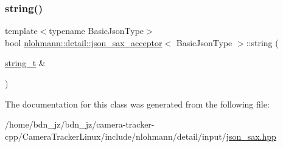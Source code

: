 \subsubsection{\texorpdfstring{string()}{string()}}
{\footnotesize\ttfamily template$<$typename Basic\+Json\+Type$>$ \\
bool \hyperlink{classnlohmann_1_1detail_1_1json__sax__acceptor}{nlohmann\+::detail\+::json\+\_\+sax\+\_\+acceptor}$<$ Basic\+Json\+Type $>$\+::string (\begin{DoxyParamCaption}\item[{\hyperlink{classnlohmann_1_1detail_1_1json__sax__acceptor_a3a8078bbf865ec355106f6048241609a}{string\+\_\+t} \&}]{ }\end{DoxyParamCaption})\hspace{0.3cm}{\ttfamily [inline]}}



The documentation for this class was generated from the following file\+:\begin{DoxyCompactItemize}
\item 
/home/bdn\+\_\+jz/bdn\+\_\+jz/camera-\/tracker-\/cpp/\+Camera\+Tracker\+Linux/include/nlohmann/detail/input/\hyperlink{json__sax_8hpp}{json\+\_\+sax.\+hpp}\end{DoxyCompactItemize}
